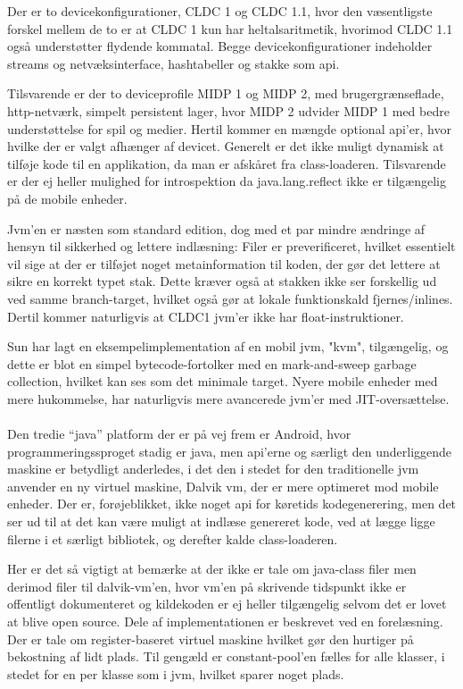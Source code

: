 Der er to device\-konfigurationer, CLDC 1 og CLDC 1.1, hvor den væsentligste forskel mellem de to er at CLDC 1 kun har heltalsaritmetik, hvorimod CLDC 1.1 også understøtter flydende kommatal. Begge device\-konfigurationer indeholder streams og netvæksinterface, hashtabeller og stakke som api.

Tilsvarende er der to device\-profile MIDP 1 og MIDP 2, med brugergrænseflade, http-netværk, simpelt persistent lager, hvor MIDP 2 udvider MIDP 1 med bedre understøttelse for spil og medier. Hertil kommer en mængde optional api'er, hvor hvilke der er valgt afhænger af devicet.
Generelt er det ikke muligt dynamisk at tilføje kode til en applikation, da man er afskåret fra class-loaderen. Tilsvarende er der ej heller mulighed for introspektion da java.lang.reflect ikke er tilgængelig på de mobile enheder.

Jvm'en er næsten som standard edition, dog med et par mindre ændringe af hensyn til sikkerhed og lettere indlæsning: Filer er preverificeret, hvilket essentielt vil sige at der er tilføjet noget metainformation til koden, der gør det lettere at sikre en korrekt typet stak. Dette kræver også at stakken ikke ser forskellig ud ved samme branch-target, hvilket også gør at lokale funktionskald fjernes/inlines. Dertil kommer naturligvis at CLDC1 jvm'er ikke har float-instruktioner.

Sun har lagt en eksempelimplementation af en mobil jvm, "kvm", tilgængelig, og dette er blot en simpel bytecode-fortolker med en mark-and-sweep garbage collection, hvilket kan ses som det minimale target. Nyere mobile enheder med mere hukommelse, har naturligvis mere avancerede jvm'er med JIT-oversættelse.

\paragraph{}
Den tredie ``java'' platform der er på vej frem er Android, hvor programmeringssproget stadig er java, men api'erne og særligt den underliggende maskine er betydligt anderledes, i det den i stedet for den traditionelle jvm anvender en ny virtuel maskine, Dalvik vm, der er mere optimeret mod mobile enheder. Der er, forøjeblikket, ikke noget api for køretids kodegenerering, men det ser ud til at det kan være muligt at indlæse genereret kode, ved at lægge ligge filerne i et særligt bibliotek, og derefter kalde class-loaderen. 

Her er det så vigtigt at bemærke at der ikke er tale om java-class filer men derimod filer til dalvik-vm'en, hvor vm'en på skrivende tidspunkt ikke er offentligt dokumenteret og kildekoden er ej heller tilgængelig selvom det er lovet at blive open source. Dele af implementationen er beskrevet ved en forelæsning\cite{dalvik-talk}. Der er tale om register-baseret virtuel maskine hvilket gør den hurtiger på bekostning af lidt plads. Til gengæld er constant-pool'en fælles for alle klasser, i stedet for en per klasse som i jvm, hvilket sparer noget plads.

